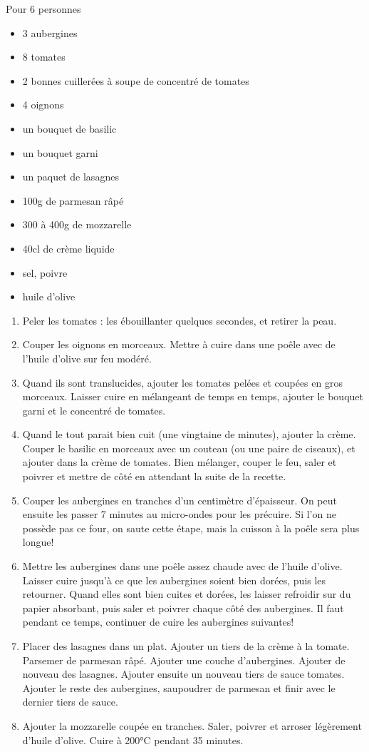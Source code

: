 \bigskip
{}
{Pour 6 personnes}{\begin{itemize}
	\item 3 aubergines
	\item 8 tomates
	\item 2 bonnes cuillerées à soupe de concentré de tomates
	\item 4 oignons
	\item un bouquet de basilic
	\item un bouquet garni
	\item un paquet de lasagnes
	\item 100g de parmesan râpé
	\item 300 à 400g de mozzarelle
	\item 40cl de crème liquide
	\item sel, poivre
	\item huile d'olive
\end{itemize}}
{\begin{enumerate}
	\item Peler les tomates : les ébouillanter quelques secondes, et retirer la peau.
	\item Couper les oignons en morceaux. Mettre à cuire dans une poêle avec de l'huile d'olive sur feu modéré. 
	\item Quand ils sont translucides, ajouter les tomates pelées et coupées en gros morceaux. Laisser cuire en mélangeant de temps en temps, ajouter le bouquet garni et le concentré de tomates. 
	\item Quand le tout parait bien cuit (une vingtaine de minutes), ajouter la crème. Couper le basilic en morceaux avec un couteau (ou une paire de ciseaux), et ajouter dans la crème de tomates. Bien mélanger, couper le feu, saler et poivrer et mettre de côté en attendant la suite de la recette.
	\item Couper les aubergines en tranches d'un centimètre d'épaisseur. On peut ensuite les passer 7 minutes au micro-ondes pour les précuire. Si l'on ne possède pas ce four, on saute cette étape, mais la cuisson à la poêle sera plus longue! 
	\item Mettre les aubergines dans une poêle assez chaude avec de l'huile d'olive. Laisser cuire jusqu'à ce que les aubergines soient bien dorées, puis les retourner. Quand elles sont bien cuites et dorées, les laisser refroidir sur du papier absorbant, puis saler et poivrer chaque côté des aubergines. Il faut pendant ce temps, continuer de cuire les aubergines suivantes!
	\item Placer des lasagnes dans un plat. Ajouter un tiers de la crème à la tomate. Parsemer de parmesan râpé. Ajouter une couche d'aubergines.  Ajouter de nouveau des lasagnes. Ajouter ensuite un nouveau tiers de sauce tomates.  Ajouter le reste des aubergines, saupoudrer de parmesan et finir avec le dernier tiers de sauce. 
	\item  Ajouter la mozzarelle coupée en tranches. Saler, poivrer et arroser légèrement d'huile d'olive.  Cuire à 200°C pendant 35 minutes. 
\end{enumerate}}

